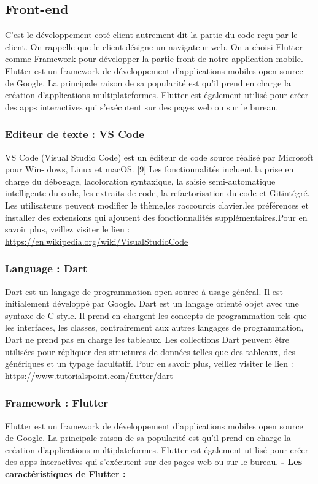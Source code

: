 \subsection{Front-end}
C’est le développement coté client autrement dit la
partie du code reçu par le client. On rappelle que le client désigne
un navigateur web.
On a choisi Flutter comme Framework pour développer la partie
front de notre application mobile.
Flutter est un framework de développement d’applications mobiles open source de Google. La principale raison de sa popularité est qu’il prend en charge la création 		   
d’applications multiplateformes. Flutter est également utilisé pour créer des apps interactives qui s’exécutent sur des pages web ou sur le bureau.
\subsubsection{Editeur de texte : VS Code}
VS Code (Visual Studio Code) est un éditeur de code source réalisé par Microsoft pour Win-
dows, Linux et macOS. [9] Les fonctionnalités incluent la prise en charge du débogage, lacoloration
syntaxique, la saisie semi-automatique intelligente du code, les extraits de code, la refactorisation du
code et Gitintégré. Les utilisateurs peuvent modifier le thème,les raccourcis clavier,les préférences et
installer des extensions qui ajoutent des fonctionnalités supplémentaires.\newline Pour en savoir plus, veillez
visiter le lien : \href{https://en.wikipedia.org/wiki/VisualStudioCode}{https://en.wikipedia.org/wiki/VisualStudioCode}
\subsubsection{Language : Dart}
Dart est un langage de programmation open source à usage général. Il est initialement développé par Google. Dart est un langage orienté objet avec une syntaxe de C-style. Il prend en chargent les concepts de programmation tels que les interfaces, les classes, contrairement aux autres langages de programmation, Dart ne prend pas en charge les tableaux.
Les collections Dart peuvent être utilisées pour répliquer des structures de données telles que des tableaux, des génériques et un typage facultatif.
\newline Pour en savoir plus, veillez
visiter le lien : \href{https://www.tutorialspoint.com/flutter/flutter_introduction_to_dart_programming.htm}{https://www.tutorialspoint.com/flutter/dart}
\subsubsection{Framework : Flutter}
Flutter est un framework de développement d’applications mobiles open source de Google. La principale raison de sa popularité est qu’il prend en charge la création 		   
d’applications multiplateformes. Flutter est également utilisé pour créer des apps interactives qui s’exécutent sur des pages web ou sur le bureau.\newline
\textbf {- Les caractéristiques de Flutter :}

